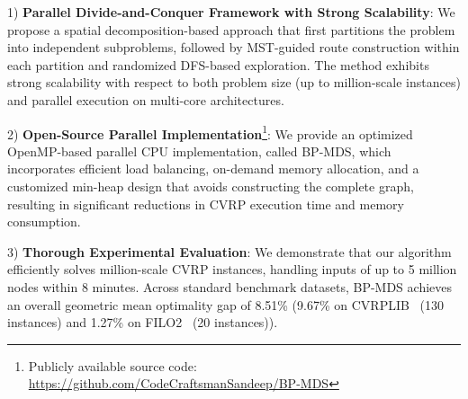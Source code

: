 1) \textbf{Parallel Divide-and-Conquer Framework with Strong Scalability}: 
We propose a spatial decomposition-based approach that first partitions the problem into independent subproblems, followed by MST-guided route construction within each partition and randomized DFS-based exploration. The method exhibits strong scalability with respect to both problem size (up to million-scale instances) and parallel execution on multi-core architectures.

2) \textbf{Open-Source Parallel Implementation}\footnote{Publicly available source code: \url{https://github.com/CodeCraftsmanSandeep/BP-MDS}}: We provide an optimized OpenMP-based parallel CPU implementation, called BP-MDS, which incorporates efficient load balancing, on-demand memory allocation, and a customized min-heap design that avoids constructing the complete graph, resulting in significant reductions in CVRP execution time and memory consumption.

3) \textbf{Thorough Experimental Evaluation}: 
We demonstrate that our algorithm efficiently solves million-scale CVRP instances, handling inputs of up to 5 million nodes within 8 minutes. Across standard benchmark datasets, BP-MDS achieves an overall geometric mean optimality gap of 8.51\% 
(9.67\% on CVRPLIB~\cite{CVRPLIB} (130 instances) and 1.27\% on FILO2~\cite{FILO2} (20 instances)).

